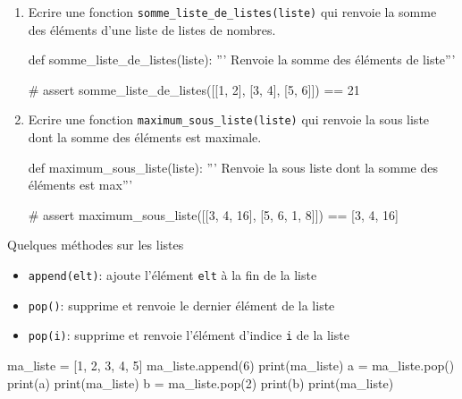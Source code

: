 \begin{exercice_cours}{}
	\begin{enumerate}
		\item Ecrire une fonction \texttt{somme\_liste\_de\_listes(liste)} qui renvoie la somme des éléments d'une liste de listes de nombres.
		
		\begin{CodePythontexAlt}[Largeur=1\linewidth,Centre,PremLigne=1, Lignes=false]{}
				def somme_liste_de_listes(liste):
					''' Renvoie la somme des éléments de liste'''









					#
				assert somme_liste_de_listes([[1, 2], [3, 4], [5, 6]]) == 21
				\end{CodePythontexAlt}

		\item Ecrire une fonction \texttt{maximum\_sous\_liste(liste)} qui renvoie la sous liste dont la somme des éléments est maximale.
		\begin{CodePythontexAlt}[Largeur=1\linewidth,Centre,PremLigne=1, Lignes=false]{}
				def maximum_sous_liste(liste):
					''' Renvoie la sous liste dont la somme des éléments est max'''










					#
				assert maximum_sous_liste([[3, 4, 16], [5, 6, 1, 8]]) == [3, 4, 16]
				\end{CodePythontexAlt}
	\end{enumerate}
\end{exercice_cours}

\begin{easybox}{Quelques méthodes sur les listes}{}

\begin{itemize}
\item \verb|append(elt)|: ajoute l'élément \verb|elt| à la fin de la liste	
\item \verb|pop()|: supprime et renvoie le dernier élément de la liste
\item \verb|pop(i)|: supprime et renvoie l'élément d'indice \verb|i| de la liste
\end{itemize}

\begin{ConsolePythontex}[Label=false]{}
ma_liste = [1, 2, 3, 4, 5]
ma_liste.append(6)
print(ma_liste)
a = ma_liste.pop()
print(a)
print(ma_liste)
b = ma_liste.pop(2)
print(b)
print(ma_liste)
		\end{ConsolePythontex}
\end{easybox}

